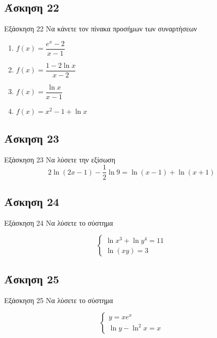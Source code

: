 \documentclass[greek]{beamer}
\begin{document}
\subsection{Άσκηση 22}
\begin{frame}[label=Άσκηση22,t]{Εξάσκηση 22}
 Να κάνετε τον πίνακα προσήμων των συναρτήσεων
 \begin{enumerate}
  \item<1-> $f(x)=\dfrac{e^x-2}{x-1}$
  \item<2-> $f(x)=\dfrac{1-2\ln x}{x-2}$
  \item<3-> $f(x)=\dfrac{\ln x}{x-1}$
  \item<4-> $f(x)=x^2-1+\ln x$
 \end{enumerate}

\end{frame}

\subsection{Άσκηση 23}
\begin{frame}[label=Άσκηση23,t]{Εξάσκηση 23}
 Να λύσετε την εξίσωση
 $$2\ln (2x-1)-\dfrac{1}{2}\ln 9=\ln (x-1)+\ln (x+1)$$

\end{frame}

\subsection{Άσκηση 24}
\begin{frame}[label=Άσκηση24,t]{Εξάσκηση 24}
 Να λύσετε το σύστημα

 $$\begin{cases}
   \ln x^3+\ln y^4=11 \\
   \ln (xy)=3
  \end{cases}$$

\end{frame}

\subsection{Άσκηση 25}
\begin{frame}[label=Άσκηση25,t]{Εξάσκηση 25}
 Να λύσετε το σύστημα

 $$\begin{cases}
   y=xe^x \\
   \ln y-\ln^2x=x
  \end{cases}$$

\end{frame}
\end{document}
